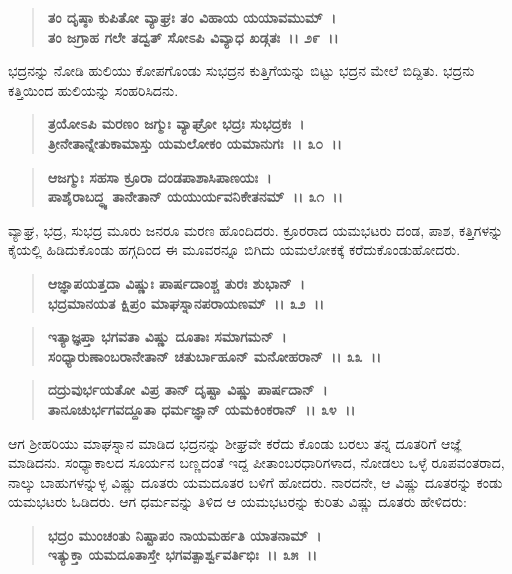 \begin{verse}
\textbf{ತಂ ದೃಷ್ಠಾ ಕುಪಿತೋ ವ್ಯಾಘ್ರಃ ತಂ ವಿಹಾಯ ಯಯಾವಮುಮ್~।}\\\textbf{ತಂ ಜಗ್ರಾಹ ಗಲೇ ತದ್ವತ್ ಸೋಽಪಿ ವಿವ್ಯಾಧ ಖಡ್ಗತಃ~।। ೨೯~।।}
\end{verse}

ಭದ್ರನನ್ನು ನೋಡಿ ಹುಲಿಯು ಕೋಪಗೊಂಡು ಸುಭದ್ರನ ಕುತ್ತಿಗೆಯನ್ನು ಬಿಟ್ಟು ಭದ್ರನ ಮೇಲೆ ಬಿದ್ದಿತು. ಭದ್ರನು ಕತ್ತಿಯಿಂದ ಹುಲಿಯನ್ನು ಸಂಹರಿಸಿದನು.

\begin{verse}
\textbf{ತ್ರಯೋಽಪಿ ಮರಣಂ ಜಗ್ಮುಃ ವ್ಯಾಘ್ರೋ ಭದ್ರಃ ಸುಭದ್ರಕಃ~।}\\\textbf{ತ್ರೀನೇತಾನ್ನೇತುಕಾಮಾಸ್ತು ಯಮಲೋಕಂ ಯಮಾನುಗಃ~।। ೩೦~।।} 
\end{verse}

\begin{verse}
\textbf{ಆಜಗ್ಮುಃ ಸಹಸಾ ಕ್ರೂರಾ ದಂಡಪಾಶಾಸಿಪಾಣಯಃ~।}\\\textbf{ಪಾಶೈರಾಬದ್ಧ್ಯ ತಾನೇತಾನ್ ಯಯುರ್ಯವನಿಕೇತನಮ್~।। ೩೧~।।}
\end{verse}

ವ್ಯಾಘ್ರ, ಭದ್ರ, ಸುಭದ್ರ ಮೂರು ಜನರೂ ಮರಣ ಹೊಂದಿದರು. ಕ್ರೂರರಾದ ಯಮಭಟರು ದಂಡ, ಪಾಶ, ಕತ್ತಿಗಳನ್ನು ಕೈಯಲ್ಲಿ ಹಿಡಿದುಕೊಂಡು ಹಗ್ಗದಿಂದ ಈ ಮೂವರನ್ನೂ ಬಿಗಿದು ಯಮಲೋಕಕ್ಕೆ ಕರೆದುಕೊಂಡುಹೋದರು.

\begin{verse}
\textbf{ಆಜ್ಞಾಪಯತ್ತದಾ ವಿಷ್ಣುಃ ಪಾರ್ಷದಾಂಶ್ಚ ತುರಃ ಶುಭಾನ್~।}\\\textbf{ಭದ್ರಮಾನಯತ ಕ್ಷಿಪ್ರಂ ಮಾಘಸ್ನಾನಪರಾಯಣಮ್~।। ೩೨~।।} 
\end{verse}

\begin{verse}
\textbf{ಇತ್ಯಾಜ್ಞಪ್ತಾ ಭಗವತಾ ವಿಷ್ಣು ದೂತಾಃ ಸಮಾಗಮನ್~।}\\\textbf{ಸಂಧ್ಯಾರುಣಾಂಬರಾನೇತಾನ್ ಚತುರ್ಬಾಹೂನ್ ಮನೋಹರಾನ್~।। ೩೩~।। }
\end{verse}

\begin{verse}
\textbf{ದದ್ರುವುರ್ಭಯತೋ ವಿಪ್ರ ತಾನ್ ದೃಷ್ಟಾ ವಿಷ್ಣು ಪಾರ್ಷದಾನ್~।}\\\textbf{ತಾನೂಚುರ್ಭಗವದ್ದೂತಾ ಧರ್ಮಜ್ಞಾನ್ ಯಮಕಿಂಕರಾನ್~।। ೩೪~।।}
\end{verse}

ಆಗ ಶ‍್ರೀಹರಿಯು ಮಾಘಸ್ನಾನ ಮಾಡಿದ ಭದ್ರನನ್ನು ಶೀಘ್ರವೇ ಕರೆದು ಕೊಂಡು ಬರಲು ತನ್ನ ದೂತರಿಗೆ ಆಜ್ಞೆ ಮಾಡಿದನು. ಸಂಧ್ಯಾಕಾಲದ ಸೂರ್ಯನ ಬಣ್ಣದಂತೆ ಇದ್ದ ಪೀತಾಂಬರಧಾರಿಗಳಾದ, ನೋಡಲು ಒಳ್ಳೆ ರೂಪವಂತರಾದ, ನಾಲ್ಕು ಬಾಹುಗಳನ್ನುಳ್ಳ ವಿಷ್ಣು ದೂತರು ಯಮದೂತರ ಬಳಿಗೆ ಹೋದರು. ನಾರದನೇ, ಆ ವಿಷ್ಣು ದೂತರನ್ನು ಕಂಡು ಯಮಭಟರು ಓಡಿದರು. ಆಗ ಧರ್ಮವನ್ನು ತಿಳಿದ ಆ ಯಮಭಟರನ್ನು ಕುರಿತು ವಿಷ್ಣು ದೂತರು ಹೇಳಿದರು:

\begin{verse}
\textbf{ಭದ್ರಂ ಮುಂಚಂತು ನಿಷ್ಟಾಪಂ ನಾಯಮರ್ಹತಿ ಯಾತನಾಮ್~।}\\\textbf{ಇತ್ಯುಕ್ತಾ ಯಮದೂತಾಸ್ತೇ ಭಗವತ್ಪಾರ್ಶ್ವವರ್ತಿಭಿಃ~।। ೩೫~।।}
\end{verse}

